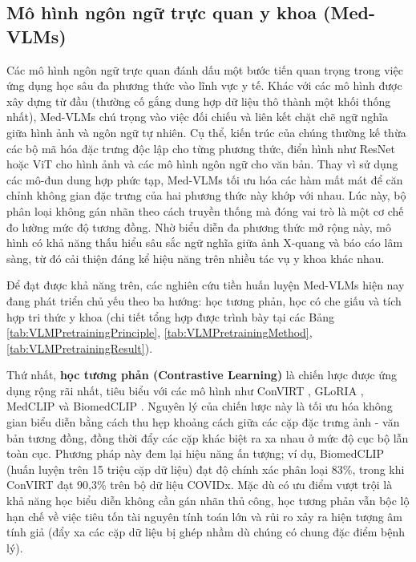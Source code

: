 \subsection{Mô hình ngôn ngữ trực quan y khoa (Med-VLMs)} Các mô hình ngôn ngữ trực quan đánh dấu một bước tiến quan trọng 
trong việc ứng dụng học sâu đa phương thức vào lĩnh vực y tế. Khác với các mô hình được xây dựng từ đầu 
(thường cố gắng dung hợp dữ liệu thô thành một khối thống nhất), Med-VLMs chú trọng vào việc đối chiếu và liên kết chặt chẽ 
ngữ nghĩa giữa hình ảnh và ngôn ngữ tự nhiên. 
Cụ thể, kiến trúc của chúng thường kế thừa các bộ mã hóa đặc trưng độc lập cho từng phương thức, 
điển hình như ResNet hoặc ViT cho hình ảnh và các mô hình ngôn ngữ cho văn bản. Thay vì sử dụng các mô-đun dung hợp phức tạp, 
Med-VLMs tối ưu hóa các hàm mất mát để căn chỉnh không gian đặc trưng của hai phương thức này khớp với nhau. 
Lúc này, bộ phân loại không gán nhãn theo cách truyền thống mà đóng vai trò là một cơ chế đo lường mức độ tương đồng. 
Nhờ biểu diễn đa phương thức mở rộng này, mô hình có khả năng thấu hiểu sâu sắc ngữ nghĩa giữa ảnh X-quang và báo cáo lâm sàng, 
từ đó cải thiện đáng kể hiệu năng trên nhiều tác vụ y khoa khác nhau.

Để đạt được khả năng trên, các nghiên cứu tiền huấn luyện Med-VLMs hiện nay đang phát triển chủ yếu theo ba hướng: học tương phản, học có che giấu và tích hợp tri thức y khoa (chi tiết tổng hợp được trình bày tại các Bảng \ref{tab:VLMPretrainingPrinciple}, \ref{tab:VLMPretrainingMethod}, \ref{tab:VLMPretrainingResult}).

Thứ nhất, \textbf{học tương phản (Contrastive Learning)} là chiến lược được ứng dụng rộng rãi nhất, tiêu biểu với các mô hình như ConVIRT \cite{ConVIRT}, GLoRIA \cite{GLoRIA}, MedCLIP \cite{MedCLIP} và BiomedCLIP \cite{BiomedCLIP}. Nguyên lý của chiến lược này là tối ưu hóa không gian biểu diễn bằng cách thu hẹp khoảng cách giữa các cặp đặc trưng ảnh - văn bản tương đồng, đồng thời đẩy các cặp khác biệt ra xa nhau ở mức độ cục bộ lẫn toàn cục. Phương pháp này đem lại hiệu năng ấn tượng; ví dụ, BiomedCLIP \cite{BiomedCLIP} (huấn luyện trên 15 triệu cặp dữ liệu) đạt độ chính xác phân loại 83\%, trong khi ConVIRT \cite{ConVIRT} đạt 90,3\% trên bộ dữ liệu COVIDx. Mặc dù có ưu điểm vượt trội là khả năng học biểu diễn không cần gán nhãn thủ công, học tương phản vẫn bộc lộ hạn chế về việc tiêu tốn tài nguyên tính toán lớn và rủi ro xảy ra hiện tượng âm tính giả (đẩy xa các cặp dữ liệu bị ghép nhầm dù chúng có chung đặc điểm bệnh lý).

